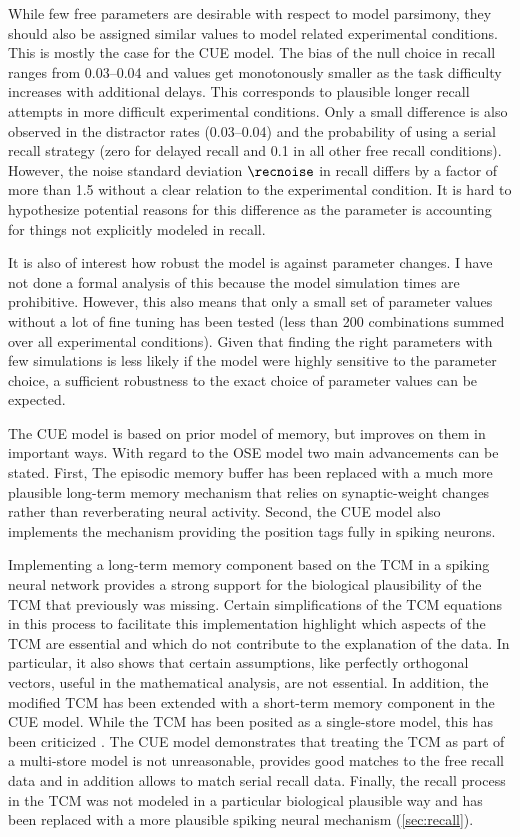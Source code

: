 While few free parameters are desirable with respect to model parsimony, they should also be assigned similar values to model related experimental conditions.
This is mostly the case for the CUE model.
The bias of the null choice in recall ranges from \numrange{0.03}{0.04} and values get monotonously smaller as the task difficulty increases with additional delays.
This corresponds to plausible longer recall attempts in more difficult experimental conditions.
Only a small difference is also observed in the distractor rates (\numrange{0.03}{0.04}) and the probability of using a serial recall strategy (zero for delayed recall and \num{0.1} in all other free recall conditions).
However, the noise standard deviation $\recnoise$ in recall differs by a factor of more than \num{1.5} without a clear relation to the experimental condition.
It is hard to hypothesize potential reasons for this difference as the parameter is accounting for things not explicitly modeled in recall.

It is also of interest how robust the model is against parameter changes.
I have not done a formal analysis of this because the model simulation times are prohibitive.
However, this also means that only a small set of parameter values without a lot of fine tuning has been tested (less than \num{200} combinations summed over all experimental conditions).
Given that finding the right parameters with few simulations is less likely if the model were highly sensitive to the parameter choice, a sufficient robustness to the exact choice of parameter values can be expected.

The CUE model is based on prior model of memory, but improves on them in important ways.
With regard to the OSE model two main advancements can be stated.
First, The episodic memory buffer has been replaced with a much more plausible long-term memory mechanism that relies on synaptic-weight changes rather than reverberating neural activity.
Second, the CUE model also implements the mechanism providing the position tags fully in spiking neurons.

Implementing a long-term memory component based on the TCM in a spiking neural network provides a strong support for the biological plausibility of the TCM that previously was missing.
Certain simplifications of the TCM equations in this process to facilitate this implementation highlight which aspects of the TCM are essential and which do not contribute to the explanation of the data.
In particular, it also shows that certain assumptions, like perfectly orthogonal vectors, useful in the mathematical analysis, are not essential.
In addition, the modified TCM has been extended with a short-term memory component in the CUE model.
While the TCM has been posited as a single-store model, this has been criticized \parencite{Davelaar2008}.
The CUE model demonstrates that treating the TCM as part of a multi-store model is not unreasonable, provides good matches to the free recall data and in addition allows to match serial recall data.
Finally, the recall process in the TCM was not modeled in a particular biological plausible way and has been replaced with a more plausible spiking neural mechanism (\cref{sec:recall}).

